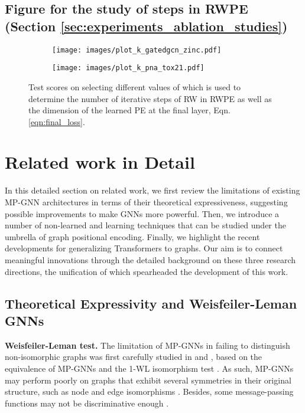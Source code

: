 \documentclass{article} \usepackage{iclr2021_conference,times}
\begin{document}
\subsection{Figure for the study of  steps in RWPE (Section \ref{sec:experiments_ablation_studies})}
\label{sec:figure_k_study}

\begin{figure}[h]
\centering
  \begin{subfigure}{0.42\linewidth}
  \centering
    \texttt{[image: images/plot\_k\_gatedgcn\_zinc.pdf]}
    \label{fig:k_plot_ZINC}
  \end{subfigure}
  \begin{subfigure}{0.40\linewidth}
  \centering
    \texttt{[image: images/plot\_k\_pna\_tox21.pdf]}
    \label{fig:k_plot_TOX21}
  \end{subfigure}
  \vspace{-16pt}
  \caption{Test scores on selecting different values of  which is used to determine the number of iterative steps of RW in RWPE as well as the dimension of the learned PE at the final layer, Eqn. \ref{eqn:final_loss}.}
  \label{fig:k_plots}
  \vspace{-12pt}
\end{figure}


\section{Related work in Detail}
\label{sec:related_work_detailed}

In this detailed section on related work, we first review the limitations of existing MP-GNN architectures in terms of their theoretical expressiveness, suggesting possible improvements to make GNNs more powerful. Then, we introduce a number of  non-learned and learning techniques that can be studied under the umbrella of graph positional encoding. Finally, we highlight the recent developments for generalizing Transformers to graphs. Our aim is to connect meaningful innovations through the detailed background on these three research directions, the unification of which spearheaded the development of this work.



\subsection{Theoretical Expressivity and Weisfeiler-Leman GNNs}
\label{sec:related_work_theory}
{\bf Weisfeiler-Leman test.} The limitation of MP-GNNs in failing to distinguish non-isomorphic graphs was first carefully studied in \cite{xu2018how} and \cite{morris2019weisfeiler}, based on the equivalence of MP-GNNs and the 1-WL isomorphism test \citep{weisfeiler1968reduction}. As such, MP-GNNs may perform poorly on graphs that exhibit several symmetries in their original structure, such as node and edge isomorphisms \citep{murphy2019relational, srinivasan2019equivalence}. Besides, some message-passing functions may not be discriminative enough \citep{xu2018how,corso2020principal}.
\end{document}
